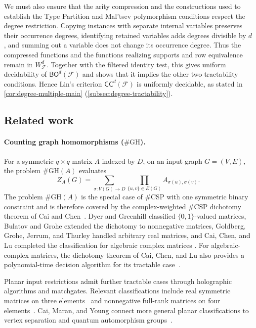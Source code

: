 \documentclass[11pt,letterpaper,onecolumn]{article}
\theoremstyle{plain}
\theoremstyle{definition}
\theoremstyle{remark}
\newcommand{\cF}{\mathcal F}
\newcommand{\CC}{\mathsf{CC}}
\newcommand{\BO}{\mathsf{BO}}
\newcommand{\WFdeg}[1]{W_{\cF}^{#1}}
\begin{document}
We must also ensure that the arity compression and the constructions used
to establish the Type Partition and Mal'tsev polymorphism conditions
respect the degree restriction.  Copying instances with separate internal
variables preserves their occurrence degrees, identifying retained variables
adds degrees divisible by $d$, and summing out a variable does not change
its occurrence degree.  Thus the compressed functions and the functions
realizing supports and row equivalence remain in $\WFdeg{d}$.  Together
with the filtered identity test, this gives uniform decidability of
$\BO^d(\cF)$ and shows that it implies the other two tractability conditions.
Hence Lin's criterion $\CC^d(\cF)$ is uniformly decidable, as stated in
\cref{cor:degree-multiple-main} (\cref{subsec:degree-tractability}).

\subsection{Related work}

\paragraph{Counting graph homomorphisms ($\#\mathrm{GH}$).}
For a symmetric $q\times q$ matrix $A$ indexed by $D$, on an
input graph $G=(V,E)$, the problem $\#\mathrm{GH}(A)$ evaluates
\[
  Z_A(G)=\sum_{\sigma:V(G)\to D}
    \prod_{\{u,v\}\in E(G)}A_{\sigma(u),\sigma(v)}.
\]
The problem $\#\mathrm{GH}(A)$ is the special case of $\#\mathrm{CSP}$ with
one symmetric binary constraint and is therefore covered by the
complex-weighted $\#\mathrm{CSP}$ dichotomy theorem of Cai and
Chen~\cite{CaiChen2017}.  Dyer and Greenhill classified $\{0,1\}$-valued
matrices, Bulatov and Grohe
extended the dichotomy to nonnegative matrices, Goldberg, Grohe, Jerrum, and
Thurley handled arbitrary real matrices, and Cai, Chen, and Lu completed the
classification for algebraic complex matrices
\cite{DyerGreenhill2000,DyerGreenhill2004,BulatovGrohe2005,
GoldbergGroheJerrumThurley2010,CaiChenLu2013}.  For algebraic-complex
matrices, the dichotomy theorem of Cai, Chen, and Lu also provides a
polynomial-time decision algorithm for its tractable
case~\cite[Theorem~1.2]{CaiChenLu2013}.

Planar input restrictions admit further tractable cases through
holographic algorithms and matchgates.  Relevant classifications include
real symmetric matrices on three elements~\cite{CaiMaran2023} and
nonnegative full-rank matrices on four elements~\cite{CaiMaran2024}.
Cai, Maran, and Young connect more general planar classifications to
vertex separation and quantum automorphism groups~\cite{CaiMaranYoung2026}.
\end{document}
